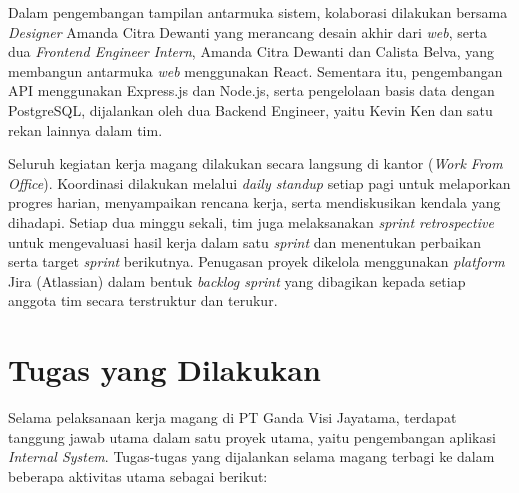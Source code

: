 Dalam pengembangan tampilan antarmuka sistem, kolaborasi dilakukan bersama \textit{Designer} Amanda Citra Dewanti yang merancang desain akhir dari \textit{web}, serta dua \textit{Frontend Engineer Intern}, Amanda Citra Dewanti dan Calista Belva, yang membangun antarmuka \textit{web} menggunakan React. Sementara itu, pengembangan API menggunakan Express.js dan Node.js, serta pengelolaan basis data dengan PostgreSQL, dijalankan oleh dua Backend Engineer, yaitu Kevin Ken dan satu rekan lainnya dalam tim.

Seluruh kegiatan kerja magang dilakukan secara langsung di kantor (\textit{Work From Office}). Koordinasi dilakukan melalui \textit{daily standup} setiap pagi untuk melaporkan progres harian, menyampaikan rencana kerja, serta mendiskusikan kendala yang dihadapi. Setiap dua minggu sekali, tim juga melaksanakan \textit{sprint retrospective} untuk mengevaluasi hasil kerja dalam satu \textit{sprint} dan menentukan perbaikan serta target \textit{sprint} berikutnya. Penugasan proyek dikelola menggunakan \textit{platform} Jira (Atlassian) dalam bentuk \textit{backlog sprint} yang dibagikan kepada setiap anggota tim secara terstruktur dan terukur.





\section{Tugas yang Dilakukan}

Selama pelaksanaan kerja magang di PT Ganda Visi Jayatama, terdapat tanggung jawab utama dalam satu proyek utama, yaitu pengembangan aplikasi \textit{Internal System}. Tugas-tugas yang dijalankan selama magang terbagi ke dalam beberapa aktivitas utama sebagai berikut:

